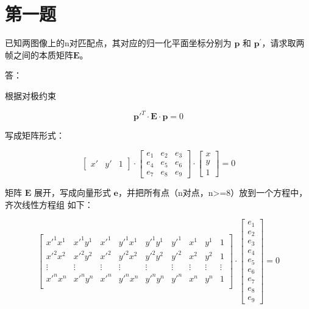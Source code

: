 \documentclass[12pt,a4paper]{article}
\begin{document}
\maketitle

\noindent
\setlength{\parindent}{2em}
\setlength{\parskip}{0.3em}

\section*{第一题}

已知两图像上的n对匹配点，其对应的归一化平面坐标分别为 $\mathbf{p}$ 和 $\mathbf{p}^\prime$，请求取两帧之间的本质矩阵$\mathbf{E}$。

答：\newline 

根据对极约束

$$
{\mathbf{p}'}^T \cdot \mathbf{E} \cdot \mathbf{p} = 0
$$

写成矩阵形式：

$$
\begin{bmatrix} x' & y' & 1 \end{bmatrix}
\cdot
\begin{bmatrix}
e_{1} & e_{2} & e_{3} \\
e_{4} & e_{5} & e_{6} \\
e_{7} & e_{8} & e_{9}
\end{bmatrix}
\cdot
\begin{bmatrix} x \\ y \\ 1 \end{bmatrix} = 0
$$

矩阵 $\mathbf{E}$ 展开，写成向量形式 $\mathbf{e}$，并把所有点（n对点，n>=8）放到一个方程中，齐次线性方程组 如下：

$$
\begin{bmatrix}
x'^1x^1 & x'^1y^1 & x'^1 &
y'^1x^1 & y'^1y^1 & y'^1 &
x^1     & y^1     & 1    \\
x'^2x^2 & x'^2y^2 & x'^2 &
y'^2x^2 & y'^2y^2 & y'^2 &
x^2     & y^2     & 1    \\
\vdots & \vdots & \vdots &
\vdots & \vdots & \vdots &
\vdots & \vdots & \vdots \\
x'^nx^n & x'^ny^n & x'^n &
y'^nx^n & y'^ny^n & y'^n &
x^n     & y^n     & 1    \\
\end{bmatrix}
\cdot
\begin{bmatrix}
e_{1} \\ e_{2} \\ e_{3} \\
e_{4} \\ e_{5} \\ e_{6} \\
e_{7} \\ e_{8} \\ e_{9}
\end{bmatrix} = 0
$$
\end{document}
